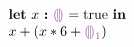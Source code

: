 

\newcommand{\THole}{\ensuremath{\SyEHole{}{}}}

\newcommand{\ELet}[2]{\ensuremath{\SyLet #1 = #2}}
\newcommand{\ELetAnn}[3]{\ensuremath{\SyLet #1 \SyColon #2 = #3}}
\newcommand{\EIn}{\ensuremath{\SyInn}}
\newcommand{\EPlus}[2]{\ensuremath{#1 \SyPlus #2}}
\newcommand{\ETimes}[2]{\ensuremath{#1 \SyTimes #2}}

\newcommand{\ETrue}{\ensuremath{\SyTrue}}
\newcommand{\EEHole}[1]{\ensuremath{\SyEHole{}{#1}}}


  \[\begin{array}{l}
    \ELetAnn{x}{\THole}{\ETrue} \EIn \\
    \EPlus{x}{(\EPlus{\ETimes{x}{6}}{\EEHole{1}})}
  \end{array}\]

